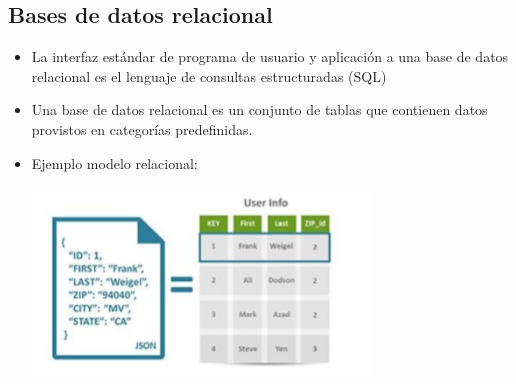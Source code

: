\documentclass[%
 reprint,
 amsmath,amssymb,
 aps,
]{revtex4-1}
\begin{document}
\subsection{Bases de datos relacional}
	          \begin{itemize}
		\item La interfaz estándar de programa de usuario y aplicación a una base de datos relacional es el lenguaje de consultas estructuradas (SQL)
                     \item Una base de datos relacional es un conjunto de tablas que contienen datos provistos en categorías predefinidas.
		\item Ejemplo modelo relacional:
                     \begin{center}
		\includegraphics[width=9cm]{./Imagenes/1}
		\end{center}	
	          \end{itemize}
\end{document}

